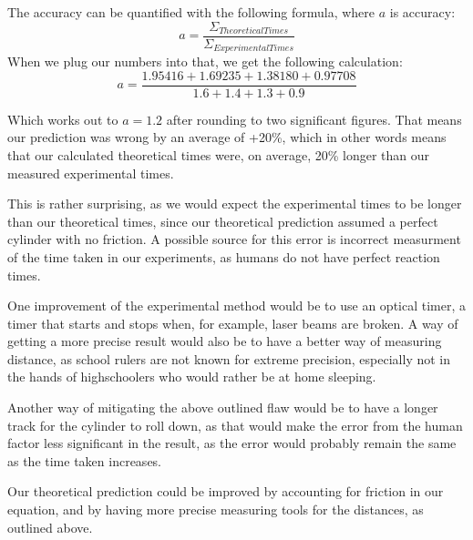 \documentclass[twoside]{article}
\begin{document}
The accuracy can be quantified with the following formula, where $a$ is accuracy:
\[ a = \frac{\Sigma_{TheoreticalTimes}}{\Sigma_{Experimental Times}} \]
When we plug our numbers into that, we get the following calculation:
\[ a = \frac{1.95416+1.69235+1.38180+0.97708}{1.6+1.4+1.3+0.9} \]

Which works out to $a = 1.2$ after rounding to two significant figures. That means our prediction was wrong by an average of +20\%, which in other words means that our calculated theoretical times were, on average, 20\% longer than our measured experimental times.

This is rather surprising, as we would expect the experimental times to be longer than our theoretical times, since our theoretical prediction assumed a perfect cylinder with no friction. A possible source for this error is incorrect measurment of the time taken in our experiments, as humans do not have perfect reaction times.

One improvement of the experimental method would be to use an optical timer, a timer that starts and stops when, for example, laser beams are broken. A way of getting a more precise result would also be to have a better way of measuring distance, as school rulers are not known for extreme precision, especially not in the hands of highschoolers who would rather be at home sleeping.

Another way of mitigating the above outlined flaw would be to have a longer track for the cylinder to roll down, as that would make the error from the human factor less significant in the result, as the error would probably remain the same as the time taken increases.

Our theoretical prediction could be improved by accounting for friction in our equation, and by having more precise measuring tools for the distances, as outlined above.
\end{document}
